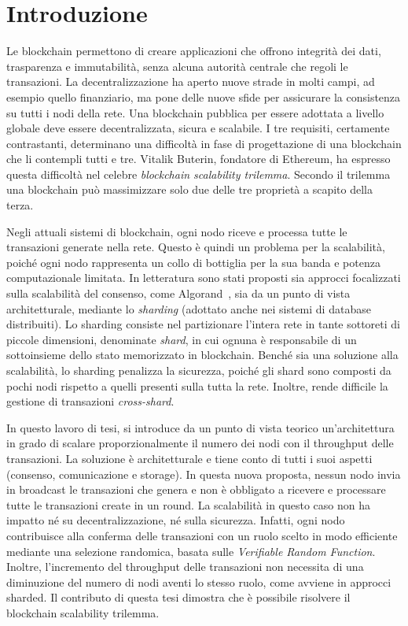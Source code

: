 \chapter{Introduzione}

Le blockchain permettono di creare applicazioni che offrono integrità dei dati, trasparenza e immutabilità, senza alcuna autorità centrale che regoli le transazioni. La decentralizzazione ha aperto nuove strade in molti campi, ad esempio quello finanziario, ma pone delle nuove sfide per assicurare la consistenza su tutti i nodi della rete. Una blockchain pubblica per essere adottata a livello globale deve essere decentralizzata, sicura e scalabile. I tre requisiti, certamente contrastanti, determinano una difficoltà in fase di progettazione di una blockchain che li contempli tutti e tre. Vitalik Buterin, fondatore di Ethereum, ha espresso questa difficoltà nel celebre \textit{blockchain scalability trilemma}. Secondo il trilemma una blockchain può massimizzare solo due delle tre proprietà a scapito della terza.

Negli attuali sistemi di blockchain, ogni nodo riceve e processa tutte le transazioni generate nella rete. Questo è quindi un problema per la scalabilità, poiché ogni nodo rappresenta un collo di bottiglia per la sua banda e potenza computazionale limitata. In letteratura sono stati proposti sia approcci focalizzati sulla scalabilità del consenso, come Algorand~\cite{gilad2017algorand}, sia da un punto di vista architetturale, mediante lo \textit{sharding} (adottato anche nei sistemi di database distribuiti). Lo sharding consiste nel partizionare l'intera rete in tante sottoreti di piccole dimensioni, denominate \textit{shard}, in cui ognuna è responsabile di un sottoinsieme dello stato memorizzato in blockchain. Benché sia una soluzione alla scalabilità, lo sharding penalizza la sicurezza, poiché gli shard sono composti da pochi nodi rispetto a quelli presenti sulla tutta la rete. Inoltre, rende difficile la gestione di transazioni \textit{cross-shard}.

In questo lavoro di tesi, si introduce da un punto di vista teorico un'architettura in grado di scalare proporzionalmente il numero dei nodi con il throughput delle transazioni. La soluzione è architetturale e tiene conto di tutti i suoi aspetti (consenso, comunicazione e storage). In questa nuova proposta, nessun nodo invia in broadcast le transazioni che genera e non è obbligato a ricevere e processare tutte le transazioni create in un round. La scalabilità in questo caso non ha impatto né su decentralizzazione, né sulla sicurezza. Infatti, ogni nodo contribuisce alla conferma delle transazioni con un ruolo scelto in modo efficiente mediante una selezione randomica, basata sulle \textit{Verifiable Random Function}. Inoltre, l'incremento del throughput delle transazioni non necessita di una diminuzione del numero di nodi aventi lo stesso ruolo, come avviene in approcci sharded. Il contributo di questa tesi dimostra che è possibile risolvere il blockchain scalability trilemma.

